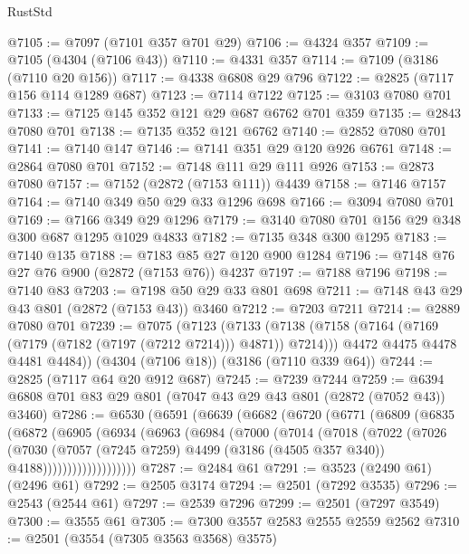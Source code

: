 \begin{lexlean}{RustStd}
\begin{coremodule}
{\begin{coremodule}
{{{{{{{{{{{{{{{{{{{{@7105 := @7097 (@7101 @357 @701 @29)
@7106 := @4324 @357
@7109 := @7105 (@4304 (@7106 @43))
@7110 := @4331 @357
@7114 := @7109 (@3186 (@7110 @20 @156))
@7117 := @4338 @6808 @29 @796
@7122 := @2825 (@7117 @156 @114 @1289 @687)
@7123 := @7114 @7122
@7125 := @3103 @7080 @701
@7133 := @7125 @145 @352 @121 @29 @687 @6762 @701 @359
@7135 := @2843 @7080 @701
@7138 := @7135 @352 @121 @6762
@7140 := @2852 @7080 @701
@7141 := @7140 @147
@7146 := @7141 @351 @29 @120 @926 @6761
@7148 := @2864 @7080 @701
@7152 := @7148 @111 @29 @111 @926
@7153 := @2873 @7080
@7157 := @7152 (@2872 (@7153 @111)) @4439
@7158 := @7146 @7157
@7164 := @7140 @349 @50 @29 @33 @1296 @698
@7166 := @3094 @7080 @701
@7169 := @7166 @349 @29 @1296
@7179 := @3140 @7080 @701 @156 @29 @348 @300 @687 @1295 @1029 @4833
@7182 := @7135 @348 @300 @1295
@7183 := @7140 @135
@7188 := @7183 @85 @27 @120 @900 @1284
@7196 := @7148 @76 @27 @76 @900 (@2872 (@7153 @76)) @4237
@7197 := @7188 @7196
@7198 := @7140 @83
@7203 := @7198 @50 @29 @33 @801 @698
@7211 := @7148 @43 @29 @43 @801 (@2872 (@7153 @43)) @3460
@7212 := @7203 @7211
@7214 := @2889 @7080 @701
@7239 := @7075
    (@7123
      (@7133
        (@7138 (@7158 (@7164 (@7169 (@7179 (@7182 (@7197 (@7212 @7214))) @4871)) @7214)))
        @4472
        @4475
        @4478
        @4481
        @4484))
    (@4304 (@7106 @18))
    (@3186 (@7110 @339 @64))
@7244 := @2825 (@7117 @64 @20 @912 @687)
@7245 := @7239 @7244
@7259 := @6394 @6808 @701 @83 @29 @801 (@7047 @43 @29 @43 @801 (@2872 (@7052 @43)) @3460)
@7286 := @6530
    (@6591
      (@6639
        (@6682
          (@6720
            (@6771
              (@6809
                (@6835
                  (@6872
                    (@6905
                      (@6934
                        (@6963
                          (@6984
                            (@7000
                              (@7014
                                (@7018
                                  (@7022
                                    (@7026
                                      (@7030
                                        (@7057
                                          (@7245 @7259)
                                          @4499
                                          (@3186 (@4505 @357 @340))
                                          @4188)))))))))))))))))))
@7287 := @2484 @61
@7291 := @3523 (@2490 @61) (@2496 @61)
@7292 := @2505 @3174
@7294 := @2501 (@7292 @3535)
@7296 := @2543 (@2544 @61)
@7297 := @2539 @7296
@7299 := @2501 (@7297 @3549)
@7300 := @3555 @61
@7305 := @7300 @3557 @2583 @2555 @2559 @2562
@7310 := @2501 (@3554 (@7305 @3563 @3568) @3575)
}}}}}}}}}}}}}}}}}}}}
\end{coremodule}}
\end{coremodule}
\end{lexlean}
